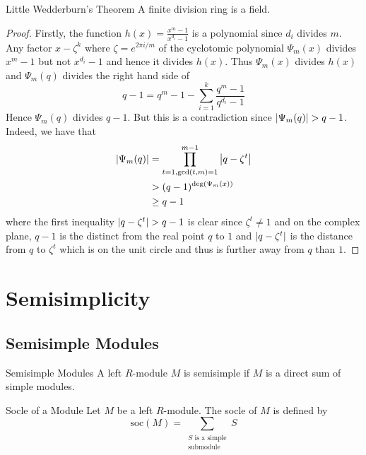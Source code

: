 \documentclass[a4paper]{article}
\begin{document}
\begin{thm}{Little Wedderburn's Theorem}{} A finite division ring is a field. \tcbline
\begin{proof}
Firstly, the function $h(x)=\frac{x^m-1}{x^{d_i}-1}$ is a polynomial since $d_i$ divides $m$. Any factor $x-\zeta^k$ where $\zeta=e^{2\pi i/m}$ of the cyclotomic polynomial $\Psi_m(x)$ divides $x^m-1$ but not $x^{d_i}-1$ and hence it divides $h(x)$. Thus $\Psi_m(x)$ divides $h(x)$ and $\Psi_m(q)$ divides the right hand side of $$q-1=q^m-1-\sum_{i=1}^k\frac{q^m-1}{q^{d_i}-1}$$ Hence $\Psi_m(q)$ divides $q-1$. But this is a contradiction since $\abs{\Psi_m(q)}>q-1$. Indeed, we have that 
\begin{align*}
\abs{\Psi_m(q)}&=\prod_{t=1,\gcd(t,m)=1}^{m-1}\abs{q-\zeta^t}\\
&>(q-1)^{\deg(\Psi_m(x))}\\
&\geq q-1
\end{align*}
where the first inequality $\abs{q-\zeta^t}>q-1$ is clear since $\zeta^t\neq 1$ and on the complex plane, $q-1$ is the distinct from the real point $q$ to $1$ and $\abs{q-\zeta^t}$ is the distance from $q$ to $\zeta^t$ which is on the unit circle and thus is further away from $q$ than $1$. 
\end{proof}
\end{thm}

\pagebreak
\section{Semisimplicity}
\subsection{Semisimple Modules}
\begin{defn}{Semisimple Modules}{} A left $R$-module $M$ is semisimple if $M$ is a direct sum of simple modules. 
\end{defn}

\begin{defn}{Socle of a Module}{} Let $M$ be a left $R$-module. The socle of $M$ is defined by $$\text{soc}(M)=\sum_{\substack{S\text{ is a simple}\\\text{submodule}}}S$$
\end{defn}
\end{document}
